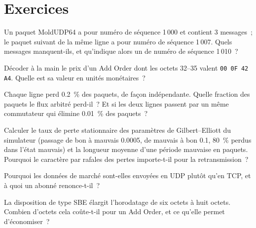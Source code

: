 \section{Exercices}

\begin{exercise}[$\star$]\label{exo:ll:protocols-ii-binary-exchange-protocols:1}
Un paquet MoldUDP64 a pour numéro de séquence 1\,000 et contient 3 messages~; le paquet suivant de la même ligne a pour numéro de séquence 1\,007. Quels
messages manquent-ils, et qu'indique alors un  de numéro de séquence 1\,010~?
\end{exercise}

\begin{exercise}[$\star$]\label{exo:ll:protocols-ii-binary-exchange-protocols:2}
Décoder à la main le prix d'un Add Order dont les octets 32--35 valent \texttt{00 0F 42 A4}. Quelle est sa valeur en unités monétaires~?
\end{exercise}

\begin{exercise}[$\star$]\label{exo:ll:protocols-ii-binary-exchange-protocols:3}
Chaque ligne perd 0.2~\% des paquets, de façon indépendante. Quelle fraction des paquets le flux arbitré perd-il~? Et si les deux lignes passent par
un même commutateur qui élimine 0.01~\% des paquets~?
\end{exercise}

\begin{exercise}[$\star\star$]\label{exo:ll:protocols-ii-binary-exchange-protocols:4}
Calculer le taux de perte stationnaire des paramètres de Gilbert--Elliott du simulateur (passage de bon à mauvais 0.0005, de mauvais à bon 0.1, 80~\%
perdus dans l'état mauvais) et la longueur moyenne d'une période mauvaise en paquets. Pourquoi le caractère par rafales des pertes importe-t-il pour la retransmission~?
\end{exercise}

\begin{exercise}[$\star\star$]\label{exo:ll:protocols-ii-binary-exchange-protocols:5}
Pourquoi les données de marché sont-elles envoyées en  UDP plutôt qu'en TCP, et à quoi un abonné renonce-t-il~?
\end{exercise}

\begin{exercise}[$\star\star$]\label{exo:ll:protocols-ii-binary-exchange-protocols:6}
La disposition de type SBE élargit l'horodatage de six octets à huit octets. Combien d'octets cela coûte-t-il pour un Add Order, et
ce qu'elle permet d'économiser~?
\end{exercise}

